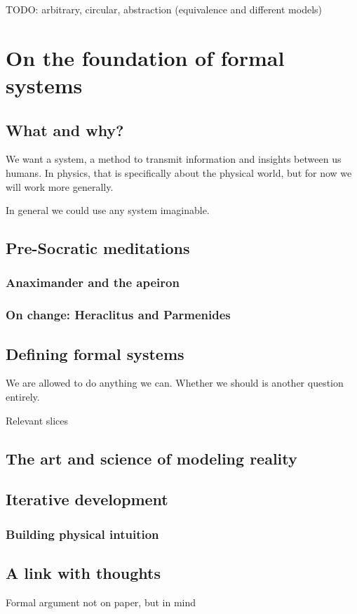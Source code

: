 TODO: arbitrary, circular, abstraction (equivalence and different models)

\section{On the foundation of formal systems}
\subsection{What and why?}
We want a system, a method to transmit information and insights between us humans. In physics, that is specifically about the physical world, but for now we will work more generally.



In general we could use any system imaginable. 

\subsection{Pre-Socratic meditations}
\subsubsection{Anaximander and the apeiron}
\subsubsection{On change: Heraclitus and Parmenides}
\subsection{Defining formal systems}
We are allowed to do anything we can. Whether we should is another question entirely.

Relevant slices

\subsection{The art and science of modeling reality}

\subsection{Iterative development}
\subsubsection{Building physical intuition}

\subsection{A link with thoughts}
Formal argument not on paper, but in mind

